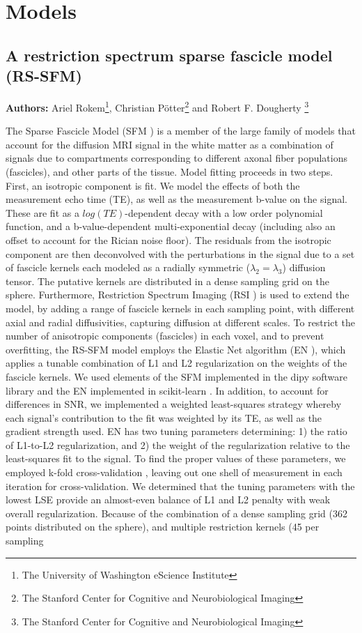 \documentclass[3p]{elsarticle}
\begin{document}
\section{Models}

\subsection{A restriction spectrum sparse fascicle model (RS-SFM)}

{\bf Authors:} Ariel Rokem\footnote{The University of Washington eScience Institute}, Christian P\"{o}tter\footnote{The Stanford Center for Cognitive and Neurobiological Imaging } and Robert F. Dougherty \footnote{The Stanford Center for Cognitive and Neurobiological Imaging}

The Sparse Fascicle Model (SFM \cite{Rokem2015}) is a member of the large family of models that account for the diffusion MRI signal in the white matter as a combination of signals due to compartments corresponding to different axonal fiber populations (fascicles), and other parts of the tissue. Model fitting proceeds in two steps. First, an isotropic component is fit. We model the effects of both the measurement echo time (TE), as well as the measurement b-value on the signal. These are fit as a $log(TE)$-dependent decay with a low order polynomial function, and a b-value-dependent multi-exponential decay (including also an offset to account for the Rician noise floor). The residuals from the isotropic component are then deconvolved with the perturbations in the signal due to a set of fascicle kernels each modeled as a radially symmetric ($\lambda_2=\lambda_3$) diffusion tensor. The putative kernels are distributed in a dense sampling grid on the sphere. Furthermore, Restriction Spectrum Imaging (RSI \cite{White2013}) is used to extend the model, by adding a range of fascicle kernels in each sampling point, with different axial and radial diffusivities, capturing diffusion at different scales. To restrict the number of anisotropic components (fascicles) in each voxel, and to prevent overfitting, the RS-SFM model employs the Elastic Net algorithm (EN \cite{Zou2005}), which applies a tunable combination of L1 and L2 regularization on the weights of the fascicle kernels. We used elements of the SFM implemented in the dipy software library \cite{Garyfallidis2014} and the EN implemented in scikit-learn \cite{pedregosa2011}. In addition, to account for differences in SNR, we implemented a weighted least-squares strategy whereby each signal’s contribution to the fit was weighted by its TE, as well as the gradient strength used. EN has two tuning parameters determining: 1) the ratio of L1-to-L2 regularization, and 2) the weight of the regularization relative to the least-squares fit to the signal. To find the proper values of these parameters, we employed k-fold cross-validation \cite{Rokem2015}, leaving out one shell of measurement in each iteration for cross-validation. We determined that the tuning parameters with the lowest LSE \cite{Panagiotaki2012} provide an almost-even balance of L1 and L2 penalty with weak overall regularization. Because of the combination of a dense sampling grid (362 points distributed on the sphere), and multiple restriction kernels (45 per sampling 
\end{document}
